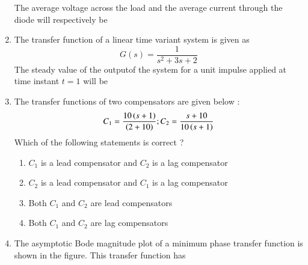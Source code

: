 \documentclass[journal,12pt,onecolumn]{IEEEtran}
\theoremstyle{remark}
\begin{document}
\begin{enumerate}
		The average voltage across the load and the average current through the diode will respectively be
		\begin{enumerate}
		\end{enumerate}
	\item The transfer function of a linear time variant system is given as 
		$$ G(s) = \frac{1}{s^2 + 3s + 2} $$
		The steady value of the outputof the system for a unit impulse applied at time instant $t=1$ will be
		\begin{enumerate}
				\begin{multicols}{4}
				\item 0
				\item 0.5
				\item 1
				\item 2
				\end{multicols}
		\end{enumerate}
	\item The transfer functions of two compensators are given below :
		$$ C_1 = \frac{10\left(s+1\right)}{\left(2+10\right)} ; C_2 = \frac{s+10}{10\left(s+1\right)} $$
		Which of the following statements is correct ?
		\begin{enumerate}
			\item $C_1$ is a lead compensator and $C_2$ is a lag compensator
			\item $C_2$ is a lead compensator and $C_1$ is a lag compensator
			\item Both $C_1$ and $C_2$ are lead compensators
			\item Both $C_1$ and $C_2$ are lag compensators
		\end{enumerate}
	\item The asymptotic Bode magnitude plot of a minimum phase transfer function is shown in the figure. This transfer function has
			\begin{figure}[H]
			\centering
			
			\caption{}
			\label{25}
		\end{figure}


\end{enumerate}
\end{document}
